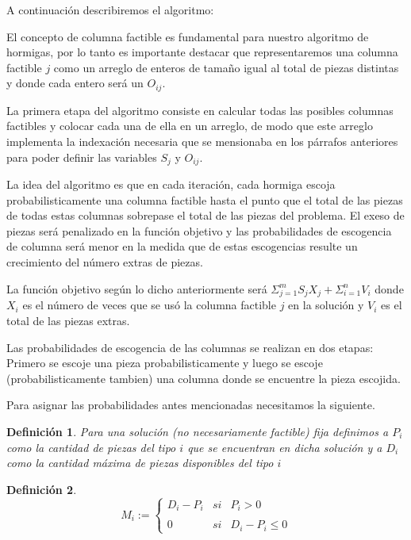 \documentclass[letterpaper,11pt]{article}
\newtheorem*{definicion}{Definici\'on}
\begin{document}
A continuaci\'on describiremos el algoritmo:

El concepto de columna factible es fundamental para nuestro algoritmo de hormigas, por lo tanto es importante destacar que representaremos 
una columna factible $j$ como un arreglo de enteros de tama\~no igual al total de piezas distintas y donde cada entero 
ser\'a un $O_{ij}$.

La primera etapa del algoritmo consiste en calcular todas las posibles columnas factibles y colocar cada una de ella en un 
arreglo, de modo que este arreglo implementa la indexaci\'on necesaria que se mensionaba en los p\'arrafos anteriores para poder definir 
las variables $S_j$ y $O_{ij}$.

La idea del algoritmo es que en cada iteraci\'on, cada hormiga escoja probabilisticamente una columna factible hasta el punto que el 
total de las piezas de todas estas columnas sobrepase el total de las piezas del problema. El exeso de piezas ser\'a penalizado en la 
funci\'on objetivo y las probabilidades de escogencia de columna ser\'a menor en la medida que de estas escogencias resulte un crecimiento del n\'umero 
extras de piezas.

La funci\'on objetivo seg\'un lo dicho anteriormente ser\'a $\Sigma _{j=1}^m S_jX_j+\Sigma _{i=1}^n V_i$ donde $X_i$ es el n\'umero de veces 
que se us\'o la columna factible $j$ en la soluci\'on y $V_i$ es el total de las piezas extras.

Las probabilidades de escogencia de las columnas se realizan en dos etapas: Primero se escoje una pieza probabilisticamente y luego se escoje 
(probabilisticamente tambien) una columna donde se encuentre la pieza escojida.

Para asignar las probabilidades antes mencionadas necesitamos la siguiente.

\begin{definicion} 
Para una soluci\'on (no necesariamente factible) fija definimos a $P_i$ como la cantidad de piezas del tipo $i$ que se encuentran en dicha 
soluci\'on y a $D_i$ como la cantidad m\'axima de piezas disponibles del tipo $i$
\end{definicion}

\begin{definicion}
$$M_i:=\left\{\begin{array}{lcc}
              D_i-P_i & si & P_i> 0 \\
             \\ 0   & si & D_i-P_i\leq 0
             \end{array}
      \right.  $$
\end{definicion}
\end{document}
